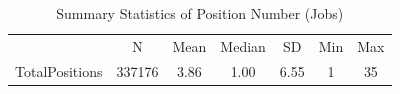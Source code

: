 \begin{table}[htbp]\centering
\def\sym#1{\ifmmode^{#1}\else\(^{#1}\)\fi}
\caption{Summary Statistics of Position Number (Jobs)}
\begin{tabular}{l*{1}{cccccc}}
\toprule
                    &           N&        Mean&      Median&          SD&         Min&         Max\\
\label{tab:company_position}
TotalPositions      &      337176&        3.86&        1.00&        6.55&           1&          35\\
\bottomrule
\end{tabular}
\end{table}
